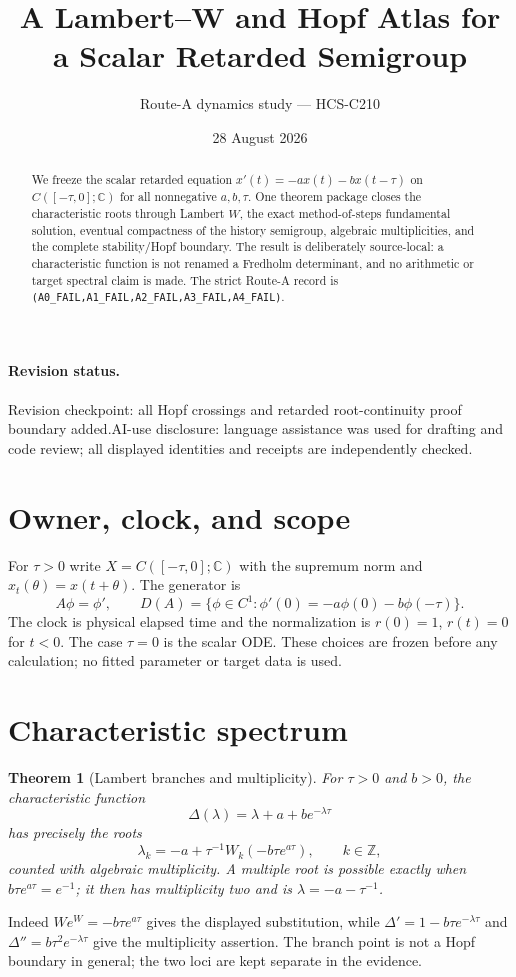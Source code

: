 \documentclass[11pt]{article}
\title{A Lambert--W and Hopf Atlas for a Scalar Retarded Semigroup}
\author{Route-A dynamics study --- HCS-C210}
\date{28 August 2026}
\newtheorem{theorem}{Theorem}
\newcommand{\revisionnote}{Revision checkpoint: all Hopf crossings and retarded root-continuity proof boundary added.}
\begin{document}
\maketitle
\paragraph{Revision status.} \revisionnote\quad AI-use disclosure: language
assistance was used for drafting and code review; all displayed identities and
receipts are independently checked.

\begin{abstract}
We freeze the scalar retarded equation $x'(t)=-a x(t)-b x(t-\tau)$ on
$C([-\tau,0];\mathbb C)$ for all nonnegative $a,b,\tau$.  One theorem package
closes the characteristic roots through Lambert $W$, the exact
method-of-steps fundamental solution, eventual compactness of the history
semigroup, algebraic multiplicities, and the complete stability/Hopf boundary.
The result is deliberately source-local: a characteristic function is not
renamed a Fredholm determinant, and no arithmetic or target spectral claim is
made.  The strict Route-A record is
\texttt{(A0\_FAIL,A1\_FAIL,A2\_FAIL,A3\_FAIL,A4\_FAIL)}.
\end{abstract}

\section{Owner, clock, and scope}
For $\tau>0$ write $X=C([-\tau,0];\mathbb C)$ with the supremum norm and
$x_t(\theta)=x(t+\theta)$.  The generator is
\[
 A\phi=\phi',\qquad D(A)=\{\phi\in C^1:\phi'(0)=-a\phi(0)-b\phi(-\tau)\}.
\]
The clock is physical elapsed time and the normalization is $r(0)=1$,
$r(t)=0$ for $t<0$.  The case $\tau=0$ is the scalar ODE.  These choices are
frozen before any calculation; no fitted parameter or target data is used.

\section{Characteristic spectrum}
\begin{theorem}[Lambert branches and multiplicity]
For $\tau>0$ and $b>0$, the characteristic function
\[
 \Delta(\lambda)=\lambda+a+b e^{-\lambda\tau}
\]
has precisely the roots
\[
 \lambda_k=-a+\tau^{-1}W_k(-b\tau e^{a\tau}),\qquad k\in\mathbb Z,
\]
counted with algebraic multiplicity.  A multiple root is possible exactly
when $b\tau e^{a\tau}=e^{-1}$; it then has multiplicity two and is
\(\lambda=-a-\tau^{-1}\).
\end{theorem}
Indeed $W e^W=-b\tau e^{a\tau}$ gives the displayed substitution, while
$\Delta'=1-b\tau e^{-\lambda\tau}$ and $\Delta''=b\tau^2e^{-\lambda\tau}$
give the multiplicity assertion.  The branch point is not a Hopf boundary in
general; the two loci are kept separate in the evidence.
\end{document}
